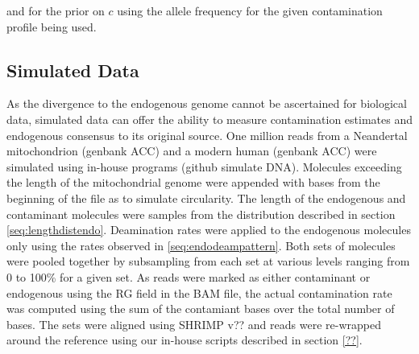 \documentclass[a4paper,12pt]{article}
\begin{document}
\noindent  and for the prior on $c$ using the allele frequency for the given contamination profile being used. 





\subsection{Simulated Data}

As the divergence to the endogenous genome cannot be ascertained for biological data, simulated data can offer the ability to measure contamination estimates and endogenous consensus to its original source. One million reads from a Neandertal mitochondrion (genbank ACC) and a modern human (genbank ACC) were simulated using in-house programs (github simulate DNA). Molecules exceeding the length of the mitochondrial genome were appended with bases from the beginning of the file as to simulate circularity. The length of the endogenous and contaminant molecules were samples from the distribution described in section \ref{seq:lengthdistendo}. Deamination rates were applied to the endogenous molecules only using the rates observed in \ref{seq:endodeampattern}. %
Both sets of molecules were pooled together by subsampling from each set at various levels ranging from 0 to 100\% for a given set. As reads were marked as either contaminant or endogenous using the RG field in the BAM file, the actual contamination rate was computed using the sum of the contamiant bases over the total number of bases. The sets were aligned using SHRIMP v?? and reads were re-wrapped around the reference using our in-house scripts described in section \ref{??}. 
\end{document}
